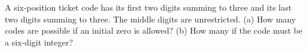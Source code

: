 A six-position ticket code has its first two digits summing to three and its last two digits summing to three. The middle digits are unrestricted. (a) How many codes are possible if an initial zero is allowed? (b) How many if the code must be a six-digit integer?
